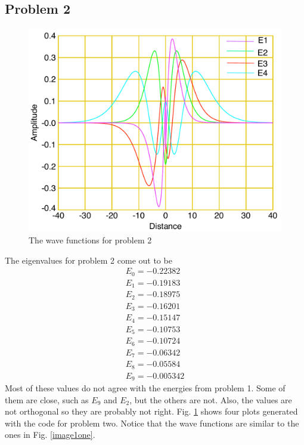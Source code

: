 \documentclass[12pt]{article}
\begin{document}
\subsection{Problem 2}
\begin {figure}[!htb]
	\includegraphics[width=1.\textwidth]{question_2/plot1.pdf}
	\caption{The wave functions for problem 2 }
	\label{image2one}
\end {figure}
The eigenvalues for problem 2 come out to be 
\begin{align*}
E_0 = -0.22382 \\ 
E_1 = -0.19183 \\
E_2 = -0.18975 \\ 
E_3 = -0.16201 \\
E_4 = -0.15147 \\ 
E_5 = -0.10753 \\
E_6 = -0.10724 \\ 
E_7 = -0.06342 \\
E_8 = -0.05584 \\ 
E_9 = -0.005342
\end{align*}
Most of these values do not agree with the energies from problem 1. Some of them are close, such as $E_9$ and $E_2$, but the others are not. Also, the values are not orthogonal so they are probably not right. Fig. \ref {image2one} shows four plots generated with the code for problem two. Notice that the wave functions are similar to the ones in Fig. \ref {image1one}.
\end{document}
